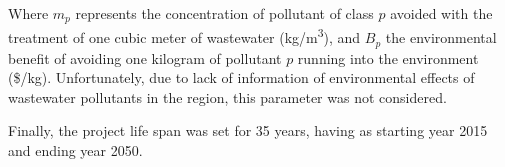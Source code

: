 Where $m_p$ represents the concentration of pollutant of class $p$ avoided with the treatment of one cubic meter of wastewater (kg/m\textsuperscript{3}), and $B_p$ the environmental benefit of avoiding one kilogram of pollutant $p$ running into the environment (\$/kg). Unfortunately, due to lack of information of environmental effects of wastewater pollutants in the region, this parameter was not considered.

Finally, the project life span was set for 35 years, having as starting year 2015 and ending year 2050.

